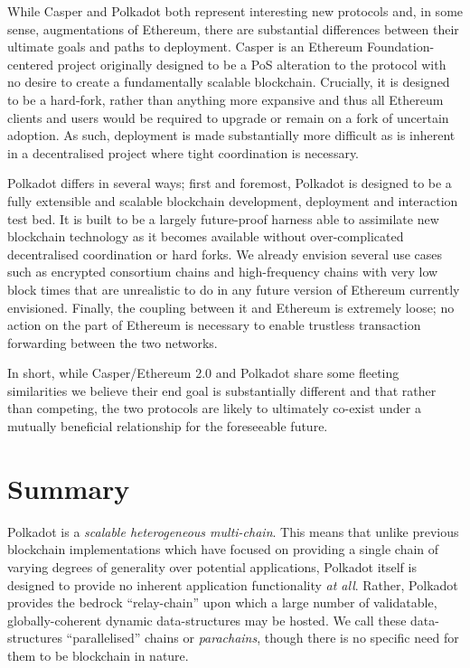 \documentclass[9pt,oneside]{amsart}
\begin{document}
\begin{multicols}{2}
 While Casper and Polkadot both represent interesting new protocols and, in some sense, augmentations of Ethereum, there are substantial differences between their ultimate goals and paths to deployment. Casper is an Ethereum Foundation-centered project originally designed to be a PoS alteration to the protocol with no desire to create a fundamentally scalable blockchain. Crucially, it is designed to be a hard-fork, rather than anything more expansive and thus all Ethereum clients and users would be required to upgrade or remain on a fork of uncertain adoption. As such, deployment is made substantially more difficult as is inherent in a decentralised project where tight coordination is necessary.

 Polkadot differs in several ways; first and foremost, Polkadot is designed to be a fully extensible and scalable blockchain development, deployment and interaction test bed. It is built to be a largely future-proof harness able to assimilate new blockchain technology as it becomes available without over-complicated decentralised coordination or hard forks. We already envision several use cases such as encrypted consortium chains and high-frequency chains with very low block times that are unrealistic to do in any future version of Ethereum currently envisioned. Finally, the coupling between it and Ethereum is extremely loose; no action on the part of Ethereum is necessary to enable trustless transaction forwarding between the two networks.

 In short, while Casper/Ethereum 2.0 and Polkadot share some fleeting similarities we believe their end goal is substantially different and that rather than competing, the two protocols are likely to ultimately co-exist under a mutually beneficial relationship for the foreseeable future.

\section{Summary}\label{summary}

Polkadot is a \emph{scalable heterogeneous multi-chain}. This means that unlike previous blockchain implementations which have focused on providing a single chain of varying degrees of generality over potential applications, Polkadot itself is designed to provide no inherent application functionality \emph{at all}. Rather, Polkadot provides the bedrock ``relay-chain'' upon which a large number of validatable, globally-coherent dynamic data-structures may be hosted. We call these data-structures ``parallelised'' chains or \textit{parachains}, though there is no specific need for them to be blockchain in nature.


\end{multicols}
\end{document}
